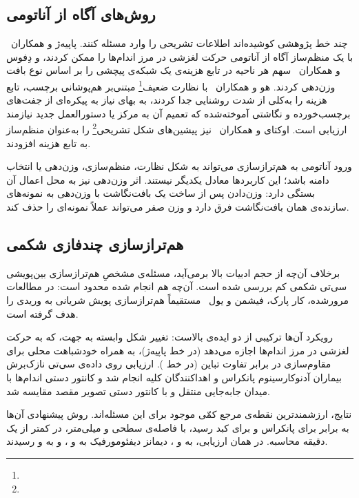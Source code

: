 \subsection*{روش‌های آگاه از آناتومی}

چند خط پژوهشی کوشیده‌اند اطلاعات تشریحی را وارد مسئله کنند. پاپیه‌ژ و همکاران~\cite{papiez2014} با یک منظم‌ساز آگاه از آناتومی حرکت لغزشی در مرز اندام‌ها را ممکن کردند، و دِ‌فوس و همکاران~\cite{devos2019} سهم هر ناحیه در تابع هزینه‌ی یک شبکه‌ی پیچشی را بر اساس نوع بافت وزن‌دهی کردند. هو و همکاران~\cite{hu2018} با نظارت ضعیف\footnote{} مبتنی‌بر هم‌پوشانی برچسب، تابع هزینه را به‌کلی از شدت روشنایی جدا کردند، به بهای نیاز به پیکره‌ای از جفت‌های برچسب‌خورده و نگاشتی آموخته‌شده که تعمیم آن به مرکز یا دستورالعمل جدید نیازمند ارزیابی است. اوکتای و همکاران~\cite{oktay2017} نیز پیشین‌های شکل تشریحی\footnote{} را به‌عنوان منظم‌ساز به تابع هزینه افزودند.


ورود آناتومی به هم‌ترازسازی می‌تواند به شکل نظارت، منظم‌سازی، وزن‌دهی یا انتخاب دامنه باشد؛ این کاربردها معادل یکدیگر نیستند. اثر وزن‌دهی نیز به محل اعمال آن بستگی دارد: وزن‌دادن پس از ساخت یک بافت‌نگاشت با وزن‌دهی به نمونه‌های سازنده‌ی همان بافت‌نگاشت فرق دارد و وزن صفر می‌تواند عملاً نمونه‌ای را حذف کند. 

\subsection*{هم‌ترازسازی چندفازی شکمی}


برخلاف آن‌چه از حجم ادبیات بالا برمی‌آید، مسئله‌ی مشخصِ هم‌ترازسازی بین‌پویشی سی‌تی شکمی کم بررسی شده است. آن‌چه هم انجام شده محدود است: در مطالعات مرورشده، کار پارک، فیشمن و یول~\cite{park2021multiphase} مستقیماً هم‌ترازسازی پویش شریانی به وریدی را هدف گرفته است.

رویکرد آن‌ها ترکیبی از دو ایده‌ی بالاست: تغییر شکل وابسته به جهت، که به حرکت لغزشی در مرز اندام‌ها اجازه می‌دهد (در خط پاپیه‌ژ)، به همراه خودشباهت محلی برای مقاوم‌سازی در برابر تفاوت تباین (در خط ). ارزیابی روی داده‌ی سی‌تی نازک‌برش بیماران آدنوکارسینوم پانکراس و اهداکنندگان کلیه انجام شد و کانتور دستی اندام‌ها با میدان جابه‌جایی منتقل و با کانتور دستی تصویر مقصد مقایسه شد.

نتایج، ارزشمندترین نقطه‌ی مرجع کمّی موجود برای این مسئله‌اند. روش پیشنهادی آن‌ها به  برابر  برای پانکراس و  برای کبد رسید، با فاصله‌ی سطحی  و  میلی‌متر، در کمتر از یک دقیقه محاسبه. در همان ارزیابی،  به  و ، دیمانز دیفئومورفیک به  و ، و  به  و  رسیدند.

